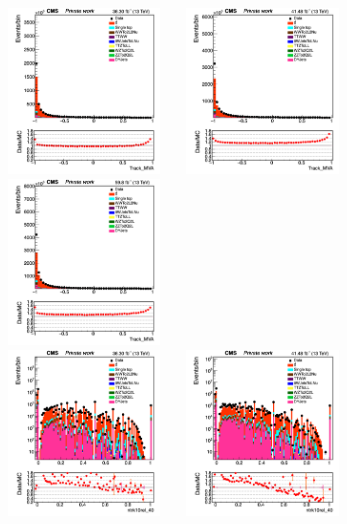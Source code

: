 \documentclass{cernatlasnote}
\begin{document}
  \begin{figure}[htp]
\centering
\includegraphics[width=4.6cm, height=4.4cm]{images/emu_channel/2016/16_Range_0pt2_1pt8/track_MVAVal_TRK_Linear.png}
\includegraphics[width=4.6cm, height=4.4cm]{images/emu_channel/2017/17_Range_0pt2_1pt8/track_MVAVal_TRK_Linear.png}
 \includegraphics[width=4.6cm, height=4.4cm]{images/emu_channel/2018/18_Range_0pt2_1pt8/track_MVAVal_TRK_Linear.png}\\
 \includegraphics[width=4.6cm, height=4.4cm]{images/emu_channel/2016/16_Range_0pt2_1pt8/track_ntrk10rel_TRK_Log.png}
\includegraphics[width=4.6cm, height=4.4cm]{images/emu_channel/2017/17_Range_0pt2_1pt8/track_ntrk10rel_TRK_Log.png}

\end{figure}
\end{document}
